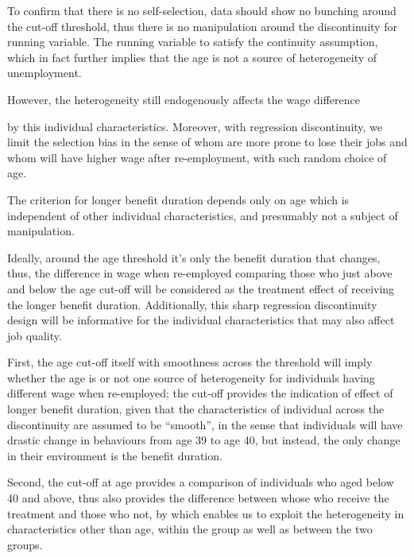 \documentclass[a4paper,12pt,oneside,English]{article}
\begin{document}
To confirm that there is no self-selection, data should show no bunching around the cut-off threshold, thus there is no manipulation around the discontinuity for running variable. The running variable to satisfy the continuity assumption, which in fact further implies that the age is not a source of heterogeneity of unemployment. 

However, the heterogeneity still endogenously affects the wage difference 

by this individual characteristics. Moreover, with regression discontinuity, we limit the selection bias in the sense of whom are more prone to lose their jobs and whom will have higher wage after re-employment, with such random choice of age.

The criterion for longer benefit duration depends only on age which is independent of other individual characteristics, and presumably not a subject of manipulation. 

Ideally, around the age threshold it’s only the benefit duration that changes, thus, the difference in wage when re-employed comparing those who just above and below the age cut-off will be considered as the treatment effect of receiving the longer benefit duration. 
Additionally, this sharp regression discontinuity design will be informative for the individual characteristics that may also affect job quality. 

First, the age cut-off itself with smoothness across the threshold will imply whether the age is or not one source of heterogeneity for individuals having different wage when re-employed; the cut-off provides the indication of effect of longer benefit duration, given that the characteristics of individual across the discontinuity are assumed to be “smooth”, in the sense that individuals will have drastic change in behaviours from age 39 to age 40, but instead, the only change in their environment is the benefit duration.

Second, the cut-off at age provides a comparison of individuals who aged below 40 and above, thus also provides the difference between whose who receive the treatment and those who not, by which enables us to exploit the heterogeneity in characteristics other than age, within the group as well as between the two groups. \\
\end{document}
